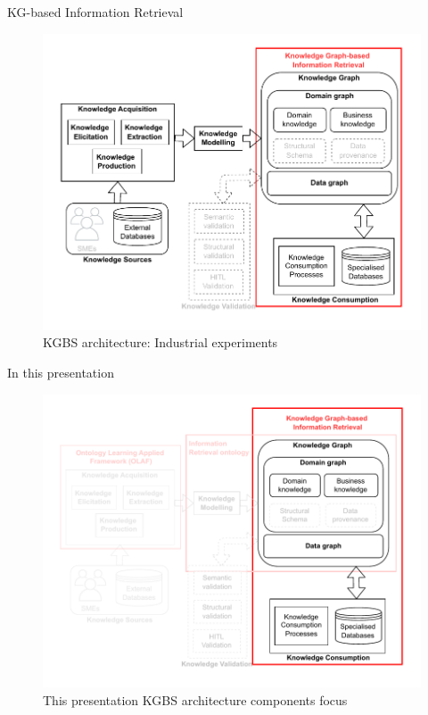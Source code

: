 \begin{frame}{KG-based Information Retrieval}

    \begin{figure} [H]
        \begin{center}
            \includegraphics[scale=0.5]{images/KGBS-knowledge-consumption-industrial-exp.pdf} 
            \caption{KGBS architecture: Industrial experiments} 
        \end{center}
    \end{figure}

\end{frame}

\begin{frame}{In this presentation}

    \begin{figure} [H]
        \begin{center}
            \includegraphics[scale=0.5]{images/KGBS-architecture-focus-TP-expe.pdf} 
            \caption{This presentation KGBS architecture components focus} 
        \end{center}
    \end{figure}

\end{frame}